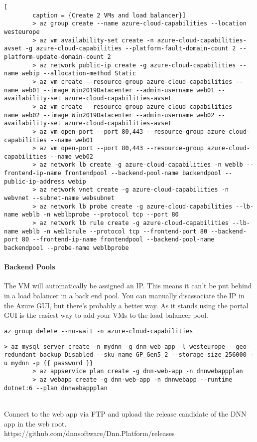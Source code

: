 \documentclass[a4paper,14pt]{report}
\begin{document}
    \begin{lstlisting}[
        caption = {Create 2 VMs and load balancer}]
        > az group create --name azure-cloud-capabilities --location westeurope
        > az vm availability-set create -n azure-cloud-capabilities-avset -g azure-cloud-capabilities --platform-fault-domain-count 2 --platform-update-domain-count 2
        > az network public-ip create -g azure-cloud-capabilities --name webip --allocation-method Static
        > az vm create --resource-group azure-cloud-capabilities --name web01 --image Win2019Datacenter --admin-username web01 --availability-set azure-cloud-capabilities-avset
        > az vm create --resource-group azure-cloud-capabilities --name web02 --image Win2019Datacenter --admin-username web02 --availability-set azure-cloud-capabilities-avset
        > az vm open-port --port 80,443 --resource-group azure-cloud-capabilities --name web01
        > az vm open-port --port 80,443 --resource-group azure-cloud-capabilities --name web02
        > az network lb create -g azure-cloud-capabilities -n weblb --frontend-ip-name frontendpool --backend-pool-name backendpool --public-ip-address webip
        > az network vnet create -g azure-cloud-capabilities -n webvnet --subnet-name websubnet
        > az network lb probe create -g azure-cloud-capabilities --lb-name weblb -n weblbprobe --protocol tcp --port 80
        > az network lb rule create -g azure-cloud-capabilities --lb-name weblb -n weblbrule --protocol tcp --frontend-port 80 --backend-port 80 --frontend-ip-name frontendpool --backend-pool-name backendpool --probe-name weblbprobe
    \end{lstlisting}

    \paragraph{Backend Pools} The VM will automatically be assigned an IP. This means it can't be put behind in a load balancer
    in a back end pool. You can manually disassociate the IP in the Azure GUI, but there's probably a better way. As it stands
    using the portal GUI is the easiest way to add your VMs to the load balancer pool.
    \begin{lstlisting}[caption={To Delete All Resources In The Group}]
    az group delete --no-wait -n azure-cloud-capabilities
    \end{lstlisting}

    \begin{lstlisting}[caption={DNN Web App}]
        > az mysql server create -n mydnn -g dnn-web-app -l westeurope --geo-redundant-backup Disabled --sku-name GP_Gen5_2 --storage-size 256000 -u mydnn -p {{ password }}
        > az appservice plan create -g dnn-web-app -n dnnwebappplan
        > az webapp create -g dnn-web-app -n dnnwebapp --runtime dotnet:6 --plan dnnwebappplan
    \end{lstlisting}
    \\
    Connect to the web app via FTP and upload the release candidate of the DNN app in the web root.
    \\
    https://github.com/dnnsoftware/Dnn.Platform/releases
\end{document}
